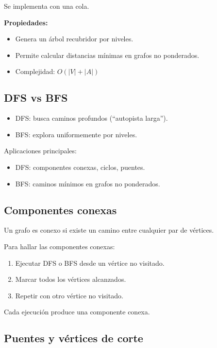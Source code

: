 \documentclass[12pt]{article}
\theoremstyle{plain}
\theoremstyle{definition}
\theoremstyle{remark}
\begin{document}
Se implementa con una cola.

\textbf{Propiedades:}

\begin{itemize}
    \item Genera un árbol recubridor por niveles.
    \item Permite calcular distancias mínimas en grafos no ponderados.
    \item Complejidad: $O(|V| + |A|)$
\end{itemize}

\subsection*{DFS vs BFS}

\begin{itemize}
    \item DFS: busca caminos profundos (``autopista larga'').
    \item BFS: explora uniformemente por niveles.
\end{itemize}

Aplicaciones principales:

\begin{itemize}
    \item DFS: componentes conexas, ciclos, puentes.
    \item BFS: caminos mínimos en grafos no ponderados.
\end{itemize}

\subsection*{Componentes conexas}

Un grafo es conexo si existe un camino entre cualquier par de vértices.

Para hallar las componentes conexas:

\begin{enumerate}
    \item Ejecutar DFS o BFS desde un vértice no visitado.
    \item Marcar todos los vértices alcanzados.
    \item Repetir con otro vértice no visitado.
\end{enumerate}

Cada ejecución produce una componente conexa.

\subsection*{Puentes y vértices de corte}
\end{document}
